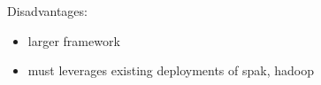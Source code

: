 Disadvantages:

\begin{itemize}
\tightlist
\item
  larger framework
\item
  must leverages existing deployments of spak, hadoop
\end{itemize}


\begin{comment}
\subsection{References}\label{references}

Collaboratories:

\begin{itemize}
\tightlist
\item
  Myers JD, TC Allison, SJ Bittner, BT Didier, M Frenklach, WH Green, YL
  Ho, J Hewson, WS Koegler, CS Lansing, D Leahy, M Lee, R McCoy, M
  Minkoff, S Nijsure, G von Laszewski, D Montoya, L Oluwole, CM
  Pancerella, R Pinzon, W Pitz, LA Rahn, B Ruscic, KL Schuchardt, EG
  Stephan, A Wagner, TL Windus, and C Yang. 2005. ``A Collaborative
  Informatics Infrastructure for Multi-scale Science.'' Cluster
  Computing 8(4):243-253.
\item
  Metadata in the Collaboratory for Multi-Scale Chemical Science Carmen
  Pancerella, John Hewson, Wendy Koegler, David Leahy, Michael Lee,
  Larry Rahn, Christine Yang, James D. Myers, Brett Didier, Renata
  McCoy, Karen Schuchardt, Eric Stephan, Theresa Windus, Kaizar Amin,
  Sandra Bittner, Carina Lansing, Michael Minkoff, Sandeep Nijsure,
  Gregor von Laszewski, Reinhardt Pinzon, Branko Ruscic, Al Wagner,
  Baoshan Wang, William Pitz, Yen-Ling Ho, David Montoya, Lili Xu,
  Thomas C. Allison, William H. Green, Jr., Michael Frenklach
  \url{http://dcpapers.dublincore.org/pubs/article/view/740/736}
\end{itemize}
\end{comment}